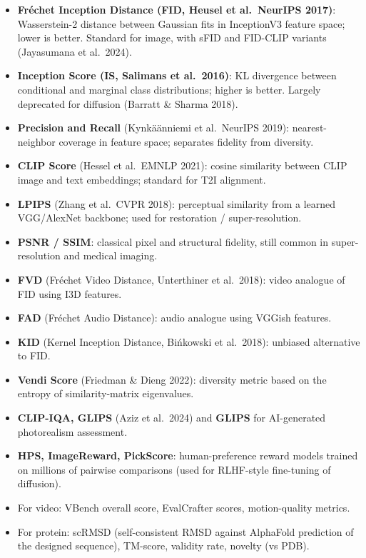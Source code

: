 \begin{itemize}
\tightlist
\item
  \textbf{Fréchet Inception Distance (FID, Heusel et al.~NeurIPS 2017)}: Wasserstein-2 distance between Gaussian fits in InceptionV3 feature space; lower is better. Standard for image, with sFID and FID-CLIP variants (Jayasumana et al.~2024).
\item
  \textbf{Inception Score (IS, Salimans et al.~2016)}: KL divergence between conditional and marginal class distributions; higher is better. Largely deprecated for diffusion (Barratt \& Sharma 2018).
\item
  \textbf{Precision and Recall} (Kynkäänniemi et al.~NeurIPS 2019): nearest-neighbor coverage in feature space; separates fidelity from diversity.
\item
  \textbf{CLIP Score} (Hessel et al.~EMNLP 2021): cosine similarity between CLIP image and text embeddings; standard for T2I alignment.
\item
  \textbf{LPIPS} (Zhang et al.~CVPR 2018): perceptual similarity from a learned VGG/AlexNet backbone; used for restoration / super-resolution.
\item
  \textbf{PSNR / SSIM}: classical pixel and structural fidelity, still common in super-resolution and medical imaging.
\item
  \textbf{FVD} (Fréchet Video Distance, Unterthiner et al.~2018): video analogue of FID using I3D features.
\item
  \textbf{FAD} (Fréchet Audio Distance): audio analogue using VGGish features.
\item
  \textbf{KID} (Kernel Inception Distance, Bińkowski et al.~2018): unbiased alternative to FID.
\item
  \textbf{Vendi Score} (Friedman \& Dieng 2022): diversity metric based on the entropy of similarity-matrix eigenvalues.
\item
  \textbf{CLIP-IQA, GLIPS} (Aziz et al.~2024) and \textbf{GLIPS} for AI-generated photorealism assessment.
\item
  \textbf{HPS, ImageReward, PickScore}: human-preference reward models trained on millions of pairwise comparisons (used for RLHF-style fine-tuning of diffusion).
\item
  For video: VBench overall score, EvalCrafter scores, motion-quality metrics.
\item
  For protein: scRMSD (self-consistent RMSD against AlphaFold prediction of the designed sequence), TM-score, validity rate, novelty (vs PDB).
\end{itemize}

